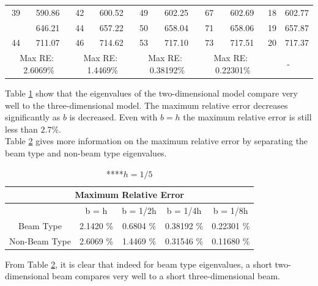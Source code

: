 \documentclass[../../main.tex]{subfiles}
\begin{document}
\begin{table}[htbp]
{{\begin{tabular}{|cc|cc|cc|cc||cc|}
			{39} & 590.86 & {42} & 600.52 & {49} & 602.25 & {67} & 602.69 & 18    & 602.77 \\
			\rowcolor{lightgray}{42} & 646.21 & {44} & 657.22 & {50} & 658.04 & {71} & 658.06 & 19    & 657.87 \\
			{44} & 711.07 & {46} & 714.62 & {53} & 717.10 & {73} & 717.51 & 20    & 717.37 \\
			\hline
			\hline
			\multicolumn{2}{|c|}{Max RE: \  2.6069\%} &\multicolumn{2}{c|}{Max RE: \ 1.4469\%}  & \multicolumn{2}{c|}{Max RE: \  0.38192\%}  & \multicolumn{2}{c||}{Max RE: \ 0.22301\%}& \multicolumn{2}{c|}{-} \\
			\hline
		\end{tabular}%
		\label{tab:2v3_1}%
	}}
\end{table}%
\FloatBarrier
Table \ref{tab:2v3_1} show that the eigenvalues of the two-dimensional model compare very well to the three-dimensional model.  The maximum relative error decreases significantly as $b$ is decreased. Even with $b = h$ the maximum relative error is still less than $2.7\%$. \\

Table \ref{tab:2Dv3D_1_breakup} gives more information on the maximum relative error by separating the beam type and non-beam type eigenvalues.


\begin{table}[htbp]
	\centering
	\caption{****$h = 1/5$}
	\begin{tabular}{|c|cccc|}
		\hline
		\multicolumn{5}{|c|}{Maximum Relative Error} \\
		\hline
		\hline
		& {b = h} & {b = 1/2h} & {b = 1/4h} & {b = 1/8h} \\
		\hline
		Beam Type & 2.1420 \% & 0.6804 \% & 0.38192 \% & 0.22301 \% \\
		Non-Beam Type & 2.6069 \% & 1.4469 \% & 0.31546 \% & 0.11680 \% \\
		\hline
	\end{tabular}%
	\label{tab:2Dv3D_1_breakup}%
\end{table}%

From Table \ref{tab:2Dv3D_1_breakup}, it is clear that indeed for beam type eigenvalues, a short two-dimensional beam compares very well to a short three-dimensional beam.\\
\end{document}
